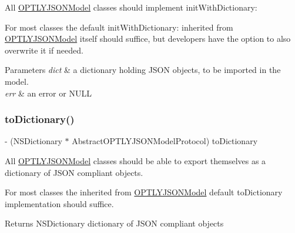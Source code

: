 All \mbox{\hyperlink{interface_o_p_t_l_y_j_s_o_n_model}{O\+P\+T\+L\+Y\+J\+S\+O\+N\+Model}} classes should implement init\+With\+Dictionary\+:

For most classes the default init\+With\+Dictionary\+: inherited from \mbox{\hyperlink{interface_o_p_t_l_y_j_s_o_n_model}{O\+P\+T\+L\+Y\+J\+S\+O\+N\+Model}} itself should suffice, but developers have the option to also overwrite it if needed.


\begin{DoxyParams}{Parameters}
{\em dict} & a dictionary holding J\+S\+ON objects, to be imported in the model. \\
\hline
{\em err} & an error or N\+U\+LL \\
\hline
\end{DoxyParams}
\mbox{\label{protocol_abstract_o_p_t_l_y_j_s_o_n_model_protocol_01-p_a49abcea522cfa69004786000aaeb935a}} 
\subsubsection{\texorpdfstring{to\+Dictionary()}{toDictionary()}}
{\footnotesize\ttfamily -\/ (N\+S\+Dictionary $\ast$ Abstract\+O\+P\+T\+L\+Y\+J\+S\+O\+N\+Model\+Protocol) to\+Dictionary \begin{DoxyParamCaption}{ }\end{DoxyParamCaption}\hspace{0.3cm}{\ttfamily [required]}}

All \mbox{\hyperlink{interface_o_p_t_l_y_j_s_o_n_model}{O\+P\+T\+L\+Y\+J\+S\+O\+N\+Model}} classes should be able to export themselves as a dictionary of J\+S\+ON compliant objects.

For most classes the inherited from \mbox{\hyperlink{interface_o_p_t_l_y_j_s_o_n_model}{O\+P\+T\+L\+Y\+J\+S\+O\+N\+Model}} default to\+Dictionary implementation should suffice.

\begin{DoxyReturn}{Returns}
N\+S\+Dictionary dictionary of J\+S\+ON compliant objects 
\end{DoxyReturn}

